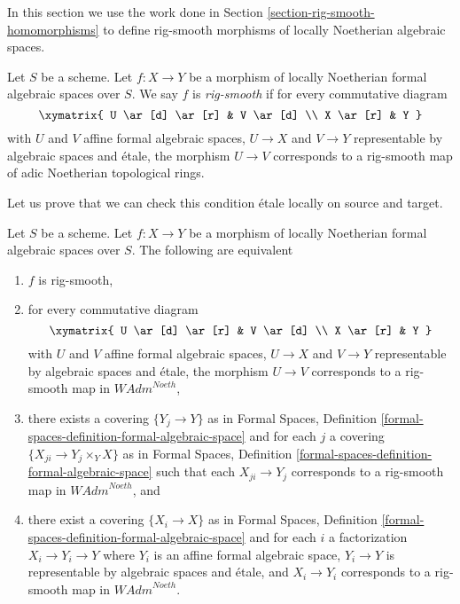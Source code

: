 \noindent
In this section we use the work done in
Section \ref{section-rig-smooth-homomorphisms}
to define rig-smooth morphisms of locally Noetherian algebraic spaces.

\begin{definition}
\label{definition-rig-smooth}
Let $S$ be a scheme. Let $f : X \to Y$ be a morphism of locally
Noetherian formal algebraic spaces over $S$. We say $f$ is
{\it rig-smooth} if for every commutative diagram
$$
\xymatrix{
U \ar[d] \ar[r] & V \ar[d] \\
X \ar[r] & Y
}
$$
with $U$ and $V$ affine formal algebraic spaces, $U \to X$ and $V \to Y$
representable by algebraic spaces and \'etale, the morphism $U \to V$
corresponds to a rig-smooth map of adic Noetherian topological rings.
\end{definition}

\noindent
Let us prove that we can check this condition \'etale locally on
source and target.

\begin{lemma}
\label{lemma-rig-smooth-morphisms}
Let $S$ be a scheme. Let $f : X \to Y$ be a morphism of
locally Noetherian formal algebraic spaces over $S$.
The following are equivalent
\begin{enumerate}
\item $f$ is rig-smooth,
\item for every commutative diagram
$$
\xymatrix{
U \ar[d] \ar[r] & V \ar[d] \\
X \ar[r] & Y
}
$$
with $U$ and $V$ affine formal algebraic spaces, $U \to X$ and $V \to Y$
representable by algebraic spaces and \'etale, the morphism $U \to V$
corresponds to a rig-smooth map in $\textit{WAdm}^{Noeth}$,
\item there exists a covering $\{Y_j \to Y\}$ as in
Formal Spaces,
Definition \ref{formal-spaces-definition-formal-algebraic-space}
and for each $j$
a covering $\{X_{ji} \to Y_j \times_Y X\}$ as in
Formal Spaces,
Definition \ref{formal-spaces-definition-formal-algebraic-space}
such that each $X_{ji} \to Y_j$  corresponds
to a rig-smooth map in $\textit{WAdm}^{Noeth}$, and
\item there exist a covering $\{X_i \to X\}$ as in
Formal Spaces,
Definition \ref{formal-spaces-definition-formal-algebraic-space}
and for each $i$ a factorization $X_i \to Y_i \to Y$ where $Y_i$
is an affine formal algebraic space, $Y_i \to Y$ is representable
by algebraic spaces and \'etale, and $X_i \to Y_i$ corresponds
to a rig-smooth map in $\textit{WAdm}^{Noeth}$.
\end{enumerate}
\end{lemma}

